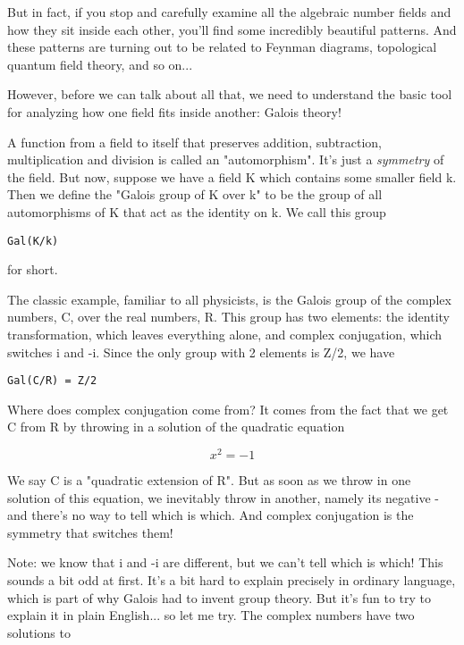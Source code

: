 But in fact, if you stop and carefully examine all the algebraic number 
fields and how they sit inside each other, you'll find some incredibly 
beautiful patterns.  And these patterns are turning out to be related to 
Feynman diagrams, topological quantum field theory, and so on...

However, before we can talk about all that, we need to understand the
basic tool for analyzing how one field fits inside another: Galois theory!

A function from a field to itself that preserves addition, subtraction,
multiplication and division is called an "automorphism".  It's just
a \emph{symmetry} of the field.  But now, suppose we have a field K which 
contains some smaller field k.  Then we define the "Galois group of K 
over k" to be the group of all automorphisms of K that act as the 
identity on k.  We call this group

\begin{verbatim}
Gal(K/k)
\end{verbatim}
    
for short.

The classic example, familiar to all physicists, is the Galois group of 
the complex numbers, C, over the real numbers, R.  This group has two 
elements: the identity transformation, which leaves everything alone, and 
complex conjugation, which switches i and -i.  Since the only group with 2
elements is Z/2, we have

\begin{verbatim}
Gal(C/R) = Z/2
\end{verbatim}
    
Where does complex conjugation come from?  It comes from the fact that
we get C from R by throwing in a solution of the quadratic equation 

$$
x^{2} = -1
$$
    
We say C is a "quadratic extension of R".  But as soon as we throw in one 
solution of this equation, we inevitably throw in another, namely its 
negative - and there's no way to tell which is which.  And complex 
conjugation is the symmetry that switches them!  

Note: we know that i and -i are different, but we can't tell which is 
which!  This sounds a bit odd at first.  It's a bit hard to explain
precisely in ordinary language, which is part of why Galois had to invent 
group theory.  But it's fun to try to explain it in plain English... 
so let me try.  The complex numbers have two solutions to

